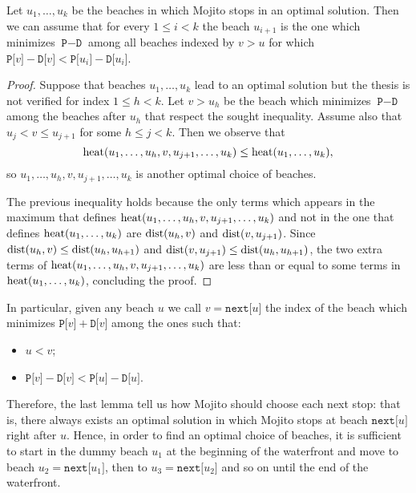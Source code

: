 \begin{lemma}
	Let $u_1,\ldots,u_k$ be the beaches in which Mojito stops in an optimal solution. Then we can assume that for every $1\le i < k$ the beach $u_{i+1}$ is the one which minimizes $\texttt{P}-\texttt{D}$ among all beaches indexed by $v>u$ for which $\texttt{P[}v \texttt{]} - \texttt{D[}v\texttt{]} < \texttt{P[}u_i \texttt{]} - \texttt{D[}u_i\texttt{]}$.
\end{lemma}
\begin{small}
\begin{proof}
	Suppose that beaches $u_1,\ldots,u_k$ lead to an optimal solution but the thesis is not verified for index $1\le h <k$. Let $v>u_h$ be the beach which minimizes $\texttt{P}-\texttt{D}$ among the beaches after $u_h$ that respect the sought inequality. Assume also that $u_j < v \le u_{j+1}$ for some $h \le j <k$.
	Then we observe that
	\begin{equation*}
		\mathrm{heat}(u_1,\ldots, u_h, v, u_{j+1}, \ldots, u_k) \le \mathrm{heat}(u_1, \ldots, u_k),
	\end{equation*}
	so $u_1,\ldots, u_h, v, u_{j+1}, \ldots, u_k$ is another optimal choice of beaches.
	
	The previous inequality holds because the only terms which appears in the maximum that defines $\mathrm{heat}(u_1,\ldots, u_h, v, u_{j+1}, \ldots, u_k)$ and not in the one that defines $\mathrm{heat}(u_1,\ldots,u_k)$ are $\mathrm{dist}(u_h,v)$ and $\mathrm{dist}(v,u_{j+1})$. Since $\mathrm{dist}(u_h,v) \le \mathrm{dist}(u_h,u_{h+1})$ and $\mathrm{dist}(v,u_{j+1}) \le \mathrm{dist}(u_h,u_{h+1})$, the two extra terms of $\mathrm{heat}(u_1,\ldots, u_h, v, u_{j+1}, \ldots, u_k)$ are less than or equal to some terms in $\mathrm{heat}(u_1, \ldots, u_k)$, concluding the proof.
\end{proof}
\end{small}

In particular, given any beach $u$ we call $v = \texttt{next[}u\texttt{]}$ the index of the beach which minimizes $\texttt{P[}v \texttt{]} + \texttt{D[}v\texttt{]}$ among the ones such that:
\begin{itemize}
	 \item $u < v$;
	 \item $\texttt{P[}v \texttt{]} - \texttt{D[}v\texttt{]} < \texttt{P[}u \texttt{]} - \texttt{D[}u\texttt{]}$.
\end{itemize}
Therefore, the last lemma tell us how Mojito should choose each next stop: that is, there always exists an optimal solution in which Mojito stops at beach $\texttt{next[}u\texttt{]}$ right after $u$.
Hence, in order to find an optimal choice of beaches, it is sufficient to start in the dummy beach $u_1$ at the beginning of the waterfront and move to beach $u_2 = \texttt{next[}u_1\texttt{]}$, then to $u_3 = \texttt{next[}u_2\texttt{]}$ and so on until the end of the waterfront.

